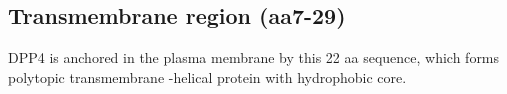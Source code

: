\subsection{Transmembrane region (aa7-29)}

DPP4 is anchored in the plasma membrane by this 22 aa sequence, which forms polytopic transmembrane \alpha-helical protein with hydrophobic core.~\cite{Hong_1990}